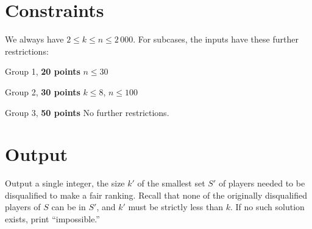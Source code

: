 \section*{Constraints}
We always have $2 \leq k \leq n \leq 2\,000$. For subcases, the inputs have these further restrictions:

\begin{description}
    \item{Group 1, \textbf{20 points}} $n \leq 30$ %
    \item{Group 2, \textbf{30 points}} $k \leq 8$, $n \leq 100$ %
    \item{Group 3, \textbf{50 points}} No further restrictions.
\end{description}


\section*{Output}
Output a single integer, the size $k'$ of the smallest set $S'$ of players needed to be disqualified to make a fair ranking. Recall that none of the originally disqualified players of $S$ can be in $S'$, and $k'$ must be strictly less than $k$. If no such solution exists, print ``impossible.''


